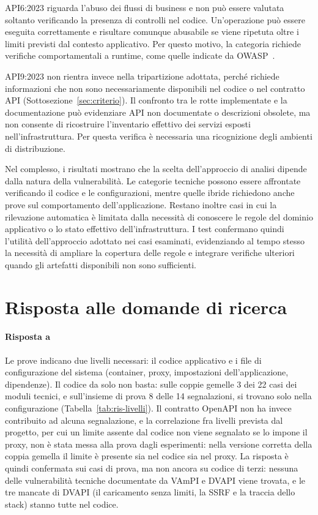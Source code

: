 API6:2023 riguarda l'abuso dei flussi di business e non può essere valutata soltanto verificando la presenza di controlli nel codice. Un'operazione può essere eseguita correttamente e risultare comunque abusabile se viene ripetuta oltre i limiti previsti dal contesto applicativo. Per questo motivo, la categoria richiede verifiche comportamentali a runtime, come quelle indicate da OWASP~\cite{owasp2023api6}.

API9:2023 non rientra invece nella tripartizione adottata, perché richiede informazioni che non sono necessariamente disponibili nel codice o nel contratto API (Sottosezione~\ref{sec:criterio}). Il confronto tra le rotte implementate e la documentazione può evidenziare API non documentate o descrizioni obsolete, ma non consente di ricostruire l'inventario effettivo dei servizi esposti nell'infrastruttura. Per questa verifica è necessaria una ricognizione degli ambienti di distribuzione.

Nel complesso, i risultati mostrano che la scelta dell'approccio di analisi dipende dalla natura della vulnerabilità. Le categorie tecniche possono essere affrontate verificando il codice e le configurazioni, mentre quelle ibride richiedono anche prove sul comportamento dell'applicazione. Restano inoltre casi in cui la rilevazione automatica è limitata dalla necessità di conoscere le regole del dominio applicativo o lo stato effettivo dell'infrastruttura. I test confermano quindi l'utilità dell'approccio adottato nei casi esaminati, evidenziando al tempo stesso la necessità di ampliare la copertura delle regole e integrare verifiche ulteriori quando gli artefatti disponibili non sono sufficienti.

\section{Risposta alle domande di ricerca}
\label{sec:ris-rq}

\paragraph{Risposta a }
Le prove indicano due livelli necessari: il codice applicativo e i file di
configurazione del sistema (container, proxy, impostazioni dell'applicazione,
dipendenze). Il codice da solo non basta: sulle coppie gemelle 3 dei 22 casi
dei moduli tecnici, e sull'insieme di prova 8 delle 14 segnalazioni, si
trovano solo nella configurazione (Tabella~\ref{tab:ris-livelli}). Il
contratto OpenAPI non ha invece contribuito ad alcuna segnalazione, e la
correlazione fra livelli prevista dal progetto, per cui un limite assente dal
codice non viene segnalato se lo impone il proxy, non è stata messa alla prova
dagli esperimenti: nella versione corretta della coppia gemella il limite è
presente sia nel codice sia nel proxy. La risposta è quindi confermata sui casi
di prova, ma non ancora su codice di terzi: nessuna delle vulnerabilità
tecniche documentate da VAmPI e DVAPI viene trovata, e le tre mancate di DVAPI
(il caricamento senza limiti, la SSRF e la traccia dello stack) stanno tutte
nel codice.


